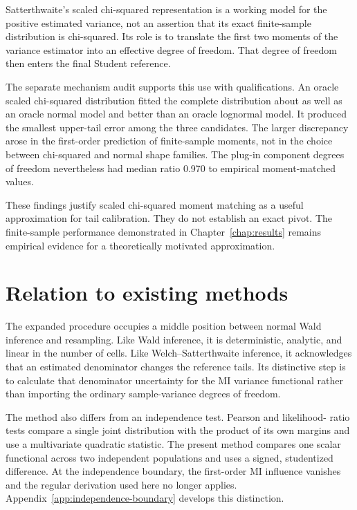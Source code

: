 Satterthwaite's scaled chi-squared representation is a working model for the
positive estimated variance, not an assertion that its exact finite-sample
distribution is chi-squared. Its role is to translate the first two moments
of the variance estimator into an effective degree of freedom. That degree
of freedom then enters the final Student reference.

The separate mechanism audit supports this use with qualifications. An
oracle scaled chi-squared distribution fitted the complete distribution about
as well as an oracle normal model and better than an oracle lognormal model.
It produced the smallest upper-tail error among the three candidates. The
larger discrepancy arose in the first-order prediction of finite-sample
moments, not in the choice between chi-squared and normal shape families.
The plug-in component degrees of freedom nevertheless had median ratio 0.970
to empirical moment-matched values.

These findings justify scaled chi-squared moment matching as a useful
approximation for tail calibration. They do not establish an exact pivot.
The finite-sample performance demonstrated in Chapter~\ref{chap:results}
remains empirical evidence for a theoretically motivated approximation.

\section{Relation to existing methods}

The expanded procedure occupies a middle position between normal Wald
inference and resampling. Like Wald inference, it is deterministic, analytic,
and linear in the number of cells. Like Welch--Satterthwaite inference, it
acknowledges that an estimated denominator changes the reference tails. Its
distinctive step is to calculate that denominator uncertainty for the MI
variance functional rather than importing the ordinary sample-variance
degrees of freedom.

The method also differs from an independence test. Pearson and likelihood-
ratio tests compare a single joint distribution with the product of its own
margins and use a multivariate quadratic statistic. The present method
compares one scalar functional across two independent populations and uses a
signed, studentized difference. At the independence boundary, the first-order
MI influence vanishes and the regular derivation used here no longer applies.
Appendix~\ref{app:independence-boundary} develops this distinction.

